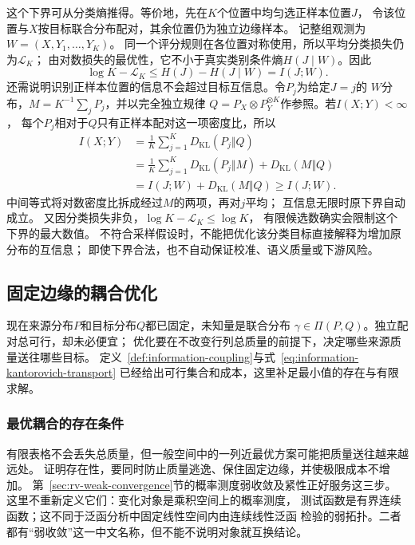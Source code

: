 这个下界可从分类熵推得。等价地，先在\(K\)个位置中均匀选正样本位置\(J\)，
令该位置与\(X\)按目标联合分布配对，其余位置仍为独立边缘样本。
记整组观测为\(W=(X,Y_1,\ldots,Y_K)\)。
同一个评分规则在各位置对称使用，所以平均分类损失仍为\(\mathcal L_K\)；
由对数损失的最优性，它不小于真实类别条件熵\(H(J\mid W)\)。因此
\[
 \log K-\mathcal L_K\leq H(J)-H(J\mid W)=I(J;W).
\]
还需说明识别正样本位置的信息不会超过目标互信息。令\(P_j\)为给定\(J=j\)的
\(W\)分布，\(M=K^{-1}\sum_jP_j\)，并以完全独立规律
\(Q=P_X\otimes P_Y^{\otimes K}\)作参照。若\(I(X;Y)<\infty\)，
每个\(P_j\)相对于\(Q\)只有正样本配对这一项密度比，所以
\[
\begin{aligned}
 I(X;Y)&=\frac1K\sum_{j=1}^KD_{\mathrm{KL}}(P_j\Vert Q)\\
 &=\frac1K\sum_{j=1}^KD_{\mathrm{KL}}(P_j\Vert M)
      +D_{\mathrm{KL}}(M\Vert Q)\\
 &=I(J;W)+D_{\mathrm{KL}}(M\Vert Q)\geq I(J;W).
\end{aligned}
\]
中间等式将对数密度比拆成经过\(M\)的两项，再对\(j\)平均；
互信息无限时原下界自动成立。
又因分类损失非负，\(\log K-\mathcal L_K\leq\log K\)，
有限候选数确实会限制这个下界的最大数值。
不符合采样假设时，不能把优化该分类目标直接解释为增加原分布的互信息；
即使下界合法，也不自动保证校准、语义质量或下游风险。

\subsection{固定边缘的耦合优化}
\label{sec:information-coupling-optimization}

现在来源分布\(P\)和目标分布\(Q\)都已固定，未知量是联合分布
\(\gamma\in\Pi(P,Q)\)。独立配对总可行，却未必便宜；
优化要在不改变行列总质量的前提下，决定哪些来源质量送往哪些目标。
定义~\ref{def:information-coupling}与式~\eqref{eq:information-kantorovich-transport}
已经给出可行集合和成本，这里补足最小值的存在与有限求解。

\subsubsection{最优耦合的存在条件}
\label{sec:information-optimal-coupling-existence}

有限表格不会丢失总质量，但一般空间中的一列近最优方案可能把质量送往越来越远处。
证明存在性，要同时防止质量逃逸、保住固定边缘，并使极限成本不增加。
第~\ref{sec:rv-weak-convergence}节的概率测度弱收敛及紧性正好服务这三步。
这里不重新定义它们：变化对象是乘积空间上的概率测度，
测试函数是有界连续函数；这不同于泛函分析中固定线性空间内由连续线性泛函
检验的弱拓扑。二者都有“弱收敛”这一中文名称，但不能不说明对象就互换结论。


